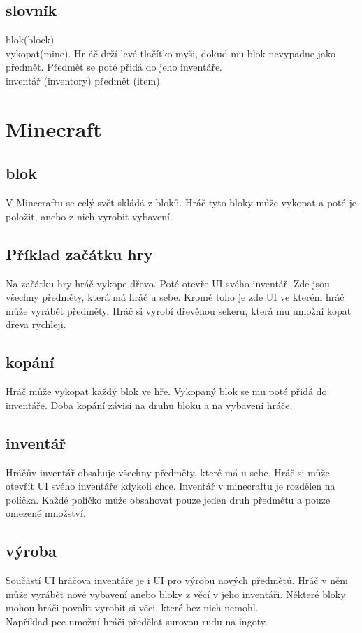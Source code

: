 \documentclass[FM,RP]{tulthesis}
\begin{document}

\section{slovník}
blok(block) \\
vykopat(mine). Hr áč drží levé tlačítko myši, dokud mu blok nevypadne jako předmět. Předmět se poté přidá do jeho inventáře.\\
inventář (inventory) 
předmět (item)


\chapter{Minecraft}
\section{blok}
V Minecraftu se celý svět skládá z bloků. Hráč tyto bloky může vykopat a poté je položit, anebo z nich vyrobit vybavení.
\section{Příklad začátku hry}
Na začátku hry hráč vykope dřevo. Poté otevře UI svého inventář. Zde jsou všechny předměty, která má hráč u sebe. Kromě toho je zde UI ve kterém hráč může vyrábět předměty. Hráč si vyrobí dřevěnou sekeru, která mu umožní kopat dřeva rychleji.
\section{kopání}
Hráč může vykopat každý blok ve hře. Vykopaný blok se mu poté přidá do inventáře. Doba kopání závisí na druhu bloku a na vybavení hráče.
\section{inventář}
Hráčův inventář obsahuje všechny předměty, které má u sebe. Hráč si může otevřít UI svého inventáře kdykoli chce. Inventář v minecraftu je rozdělen na políčka. Každé políčko může obsahovat pouze jeden druh předmětu a pouze omezené množství.
\section{výroba}
Součástí UI hráčova inventáře je i UI pro výrobu nových předmětů. Hráč v něm může vyrábět nové vybavení anebo bloky z věcí v jeho inventáři. Některé bloky mohou hráči povolit vyrobit si věci, které bez nich nemohl.\\ Například pec umožní hráči předělat surovou rudu na ingoty.  
\end{document}
